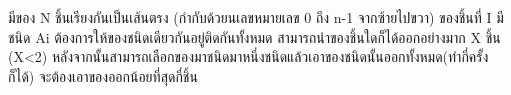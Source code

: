 มีของ N ชิ้นเรียงกันเป็นเส้นตรง (กำกับด้วยนเลขหมายเลข 0 ถึง n-1 จากซ้ายไปขวา) ของชิ้นที่ I มีชนิด Ai ต้องการให้ของชนิดเดียวกันอยู่ติดกันทั้งหมด สามารถนำของชิ้นใดก็ได้ออกอย่างมาก X ชิ้น (X<2) หลังจากนั้นสามารถเลือกของมาชนิดมาหนึ่งชนิดแล้วเอาของชนิดนั้นออกทั้งหมด(ทำกี่ครั้งก็ได้) จะต้องเอาของออกน้อยที่สุดกี่ชิ้น
